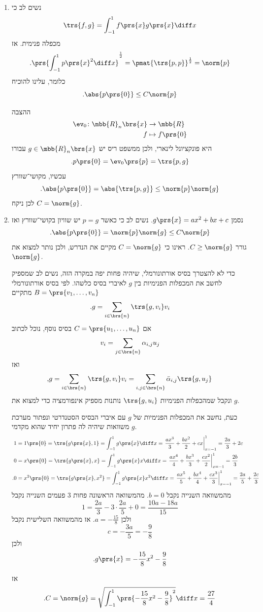 \documentclass[a4paper,10pt,twoside,openany]{book}
\begin{document}
\begin{solution}
\begin{enumerate}
\item נשים לב כי
\[\trs{f,g} = \int_{-1}^1 f\prs{x} g\prs{x} \diff x\]
מכפלה פנימית.
אז
\begin{align*}
\text{.} \prs{\int_{-1}^1 p\prs{x}^2 \diff x}^{\frac{1}{2}} = \pmat{\trs{p,p}}^{\frac{1}{2}} = \norm{p}
\end{align*}
כלומר, עלינו להוכיח
\[\text{.} \abs{p\prs{0}} \leq C\norm{p}\]

ההצבה
\begin{align*}
\ev_0 \colon \mbb{R}_n\brs{x} &\to \mbb{R} \\
f &\mapsto f\prs{0}
\end{align*}
היא פונקציונל לינארי, ולכן ממשפט ריס יש
$g \in \mbb{R}_n\brs{x}$
עבורו
\[\text{.} p\prs{0} = \ev_0\prs{p} = \trs{p,g}\]
עכשיו, מקושי־שוורץ
\[\text{.} \abs{p\prs{0}} = \abs{\trs{p,g}} \leq \norm{p} \norm{g}\]
לכן ניקח
$C = \norm{g}$.

\item
נסמן
$g\prs{x} = ax^2 + bx + c$.
נשים לב כי
כאשר
$p = g$
יש שוויון בקושי־שוורץ ואז
\[\text{.} \abs{p\prs{0}} = \norm{p}\norm{g} \leq C\norm{p}\]
גורר
$C \geq \norm{g}$.
ראינו כי
$C = \norm{g}$
מקיים את הנדרש, ולכן נותר למצוא את
$\norm{g}$.

כדי לא להצטרך בסיס אורתונורמלי, שיהיה פחות יפה במקרה הזה, נשים לב שמספיק לחשב את המכפלות הפנימיות בין
$g$
לאיברי בסיס כלשהו.
לפי בסיס אורתונורמלי
$B = \prs{v_1, \ldots, v_n}$
מתקיים
\[\text{.} g = \sum_{i \in \brs{n}} \trs{g, v_i} v_i\]
אם
$C = \prs{u_1, \ldots, u_n}$
בסיס נוסף, נוכל לכתוב
\[v_i = \sum_{j \in \brs{n}} \alpha_{i,j} u_j\]
ואז
\[\text{,} g = \sum_{i \in \brs{n}} \trs{g, v_i} v_i = \sum_{i,j \in \brs{n}} \bar{\alpha}_{i,j} \trs{g, u_j}\]
ונקבל שמהכפלות הפנימיות
$\trs{g, u_i}$
נותנות מספיק אינפורמציה כדי למצוא את
$g$.

כעת, נחשב את המכפלות הפנימיות של
$g$
עם איברי הבסיס הסטנדרטי ונפתור מערכת משוואות שיהיה לה פתרון יחיד שהוא מקדמי
$g$.
\begin{align*}
1 &= 1\prs{0} = \trs{g\prs{x},1} = \int_{-1}^1 g\prs{x} \diff x = \left. \frac{ax^3}{3} + \frac{bx^2}{2} + cx \right|_{x=-1}^1 = \frac{2a}{3} + 2c \\
0 &= x\prs{0} = \trs{g\prs{x}, x} = \int_{-1}^1 g\prs{x} x \diff x = \left. \frac{ax^4}{4} + \frac{bx^3}{3} + \frac{cx^2}{2} \right|_{x=-1}^1 = \frac{2b}{3} \\
\text{.} 0 &= x^2\prs{0} = \trs{g\prs{x}, x^2} = \int_{-1}^1 g\prs{x} x^2 \diff x = \left. \frac{ax^5}{5} + \frac{bx^4}{4} + \frac{cx^3}{3} \right|_{x=-1}^1 = \frac{2a}{5} + \frac{2c}{3}
\end{align*}
מהמשוואה השנייה נקבל
$b = 0$.
מהמשוואה הראשונה פחות
$3$
פעמים השנייה נקבל
\[1 = \frac{2a}{3} - 3 \cdot \frac{2a}{5} + 0 = \frac{10a - 18a}{15}\]
ולכן
$a = -\frac{15}{8}$.
אז מהמשוואה השלישית נקבל
\[c = -\frac{3a}{5} = -\frac{9}{8}\]
ולכן
\[\text{.} g\prs{x} = -\frac{15}{8} x^2 - \frac{9}{8}\]

אז
\[\text{.} C = \norm{g} = \sqrt{\int_{-1}^1 \prs{-\frac{15}{8} x^2 - \frac{9}{8}}^2} \diff x = \frac{27}{4}\]
\end{enumerate}
\end{solution}
\end{document}

